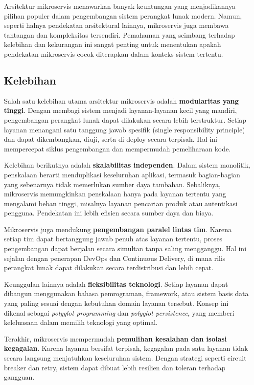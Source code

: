 Arsitektur mikroservis menawarkan banyak keuntungan yang menjadikannya pilihan populer dalam pengembangan sistem perangkat lunak modern. Namun, seperti halnya pendekatan arsitektural lainnya, mikroservis juga membawa tantangan dan kompleksitas tersendiri. Pemahaman yang seimbang terhadap kelebihan dan kekurangan ini sangat penting untuk menentukan apakah pendekatan mikroservis cocok diterapkan dalam konteks sistem tertentu.

\subsection{Kelebihan}

Salah satu kelebihan utama arsitektur mikroservis adalah \textbf{modularitas yang tinggi}. Dengan membagi sistem menjadi layanan-layanan kecil yang mandiri, pengembangan perangkat lunak dapat dilakukan secara lebih terstruktur. Setiap layanan menangani satu tanggung jawab spesifik (single responsibility principle) dan dapat dikembangkan, diuji, serta di-deploy secara terpisah. Hal ini mempercepat siklus pengembangan dan mempermudah pemeliharaan kode.

Kelebihan berikutnya adalah \textbf{skalabilitas independen}. Dalam sistem monolitik, penskalaan berarti menduplikasi keseluruhan aplikasi, termasuk bagian-bagian yang sebenarnya tidak memerlukan sumber daya tambahan. Sebaliknya, mikroservis memungkinkan penskalaan hanya pada layanan tertentu yang mengalami beban tinggi, misalnya layanan pencarian produk atau autentikasi pengguna. Pendekatan ini lebih efisien secara sumber daya dan biaya.

Mikroservis juga mendukung \textbf{pengembangan paralel lintas tim}. Karena setiap tim dapat bertanggung jawab penuh atas layanan tertentu, proses pengembangan dapat berjalan secara simultan tanpa saling mengganggu. Hal ini sejalan dengan penerapan DevOps dan Continuous Delivery, di mana rilis perangkat lunak dapat dilakukan secara terdistribusi dan lebih cepat.

Keunggulan lainnya adalah \textbf{fleksibilitas teknologi}. Setiap layanan dapat dibangun menggunakan bahasa pemrograman, framework, atau sistem basis data yang paling sesuai dengan kebutuhan domain layanan tersebut. Konsep ini dikenal sebagai \textit{polyglot programming} dan \textit{polyglot persistence}, yang memberi keleluasaan dalam memilih teknologi yang optimal.

Terakhir, mikroservis mempermudah \textbf{pemulihan kesalahan dan isolasi kegagalan}. Karena layanan bersifat terpisah, kegagalan pada satu layanan tidak secara langsung menjatuhkan keseluruhan sistem. Dengan strategi seperti circuit breaker dan retry, sistem dapat dibuat lebih resilien dan toleran terhadap gangguan.

